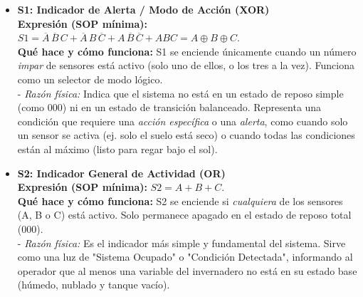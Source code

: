 \begin{itemize}
    \item \textbf{S1: Indicador de Alerta / Modo de Acción (XOR)}\\
    \textbf{Expresión (SOP mínima):} \(\displaystyle S1 = \overline{A}\,\overline{B}\,C + \overline{A}\,B\,\overline{C} + A\,\overline{B}\,\overline{C} + ABC = A \oplus B \oplus C\).\\
    \textbf{Qué hace y cómo funciona:} S1 se enciende únicamente cuando un número \emph{impar} de sensores está activo (solo uno de ellos, o los tres a la vez). Funciona como un selector de modo lógico.\\
    - \emph{Razón física:} Indica que el sistema no está en un estado de reposo simple (como 000) ni en un estado de transición balanceado. Representa una condición que requiere una \emph{acción específica} o una \emph{alerta}, como cuando solo un sensor se activa (ej. solo el suelo está seco) o cuando todas las condiciones están al máximo (listo para regar bajo el sol).

    \item \textbf{S2: Indicador General de Actividad (OR)}\\
    \textbf{Expresión (SOP mínima):} \(\displaystyle S2 = A + B + C\).\\
    \textbf{Qué hace y cómo funciona:} S2 se enciende si \emph{cualquiera} de los sensores (A, B o C) está activo. Solo permanece apagado en el estado de reposo total (000).\\
    - \emph{Razón física:} Es el indicador más simple y fundamental del sistema. Sirve como una luz de "Sistema Ocupado" o "Condición Detectada", informando al operador que al menos una variable del invernadero no está en su estado base (húmedo, nublado y tanque vacío).


\end{itemize}
